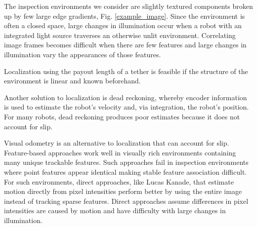 \documentclass[letterpaper, 10 pt, conference]{ieeeconf}
\begin{document}
The inspection environments we consider are slightly textured components broken up by few large edge gradients, Fig. \ref{example_image}. Since the environment is often a closed space, large changes in illumination occur when a robot with an integrated light source traverses an otherwise unlit environment. Correlating image frames becomes difficult when there are few features and large changes in illumination vary the appearances of those features.

Localization using the payout length of a tether is feasible if the structure of the environment is linear and known beforehand. 

Another solution to localization is dead reckoning, whereby encoder information is used to estimate the robot's velocity and, via integration, the robot's position. For many robots, dead reckoning produces poor estimates because it does not account for slip.


Visual odometry is an alternative to localization that can account for slip. Feature-based approaches work well in visually rich environments containing many unique trackable features. Such approaches fail in inspection environments where point features appear identical making stable feature association difficult. For such environments, direct approaches, like Lucas Kanade, that estimate motion directly from pixel intensities perform better by using the entire image instead of tracking sparse features. Direct approaches assume differences in pixel intensities are caused by motion and have difficulty with large changes in illumination.
\end{document}
